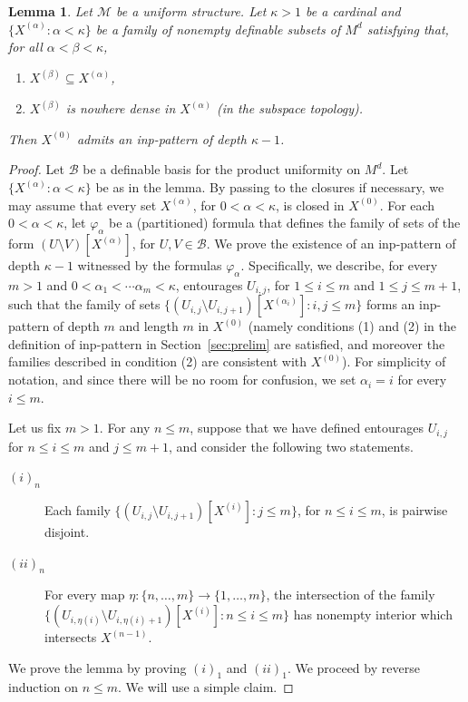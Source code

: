 \documentclass[12pt]{article}
\newcommand{\Bb}{\mathcal{B}}
\newcommand{\Mm}{\mathcal{M}}
\newcommand{\BU}{\Bb} %
\newcommand{\X}[1]{X^{(#1)}}
\newtheorem{lemma}[theorem]{Lemma}
\theoremstyle{definition}
\theoremstyle{remark}
\begin{document}
\begin{lemma}\label{lem:closed-chain}
Let $\Mm$ be a uniform structure. Let $\kappa>1$ be a cardinal and $\{ \X{\alpha} : \alpha < \kappa\}$ be a family of nonempty definable subsets of $M^d$ satisfying that, for all $\alpha < \beta < \kappa$,
\begin{enumerate}
    \item $\X{\beta} \subseteq \X{\alpha}$,
    \item $\X{\beta}$ is nowhere dense in $\X{\alpha}$ (in the subspace topology).
\end{enumerate}
Then $\X{0}$ admits an inp-pattern of depth $\kappa-1$. 
\end{lemma}
\begin{proof}
Let $\BU$ be a definable basis for the product uniformity on $M^d$. Let $\{ \X{\alpha} : \alpha < \kappa\}$ be as in the lemma. By passing to the closures if necessary, we may assume that every set $\X{\alpha}$, for $0<\alpha<\kappa$, is closed in $\X{0}$. For each $0<\alpha<\kappa$, let $\varphi_\alpha$ be a (partitioned) formula that defines the family of sets of the form $(U\setminus V)[\X{\alpha}]$, for $U,V\in \BU$. We prove the existence of an inp-pattern of depth $\kappa-1$ witnessed by the formulas $\varphi_\alpha$. Specifically, we describe, for every $m>1$ and $0<\alpha_1<\cdots\alpha_m < \kappa$, entourages $U_{i,j}$, for $1\leq i\leq m$ and $1\leq j\leq m+1$, such that the family of sets $\{ (U_{i,j} \setminus U_{i,j+1})[\X{\alpha_i}] : i, j\leq m\}$ forms an inp-pattern of depth $m$ and length $m$ in $\X{0}$ (namely conditions (1) and (2) in the definition of inp-pattern in Section~\ref{sec:prelim} are satisfied, and moreover the families described in condition (2) are consistent with $\X{0}$). For simplicity of notation, and since there will be no room for confusion, we set $\alpha_i=i$ for every $i\leq m$.

Let us fix $m>1$. For any $n\leq m$, suppose that we have defined entourages $U_{i,j}$ for $n\leq i \leq m$ and $j\leq m+1$, and consider the following two statements.
\begin{description}
    \item[$(i)_n$] Each family $\{ (U_{i,j} \setminus U_{i,j+1})[\X{i}] : j\leq m\}$, for $n\leq i\leq m$, is pairwise disjoint. 
    \item[$(ii)_n$] For every map $\eta:\{n,\ldots, m\}\rightarrow \{1,\ldots, m\}$, the intersection of the family $\{ (U_{i,\eta(i)} \setminus U_{i,\eta(i)+1})[\X{i}] : n\leq i\leq m \}$ has nonempty interior which intersects $\X{n-1}$.
\end{description}
We prove the lemma by proving $(i)_1$ and $(ii)_1$. We proceed by reverse induction on $n\leq m$. We will use a simple claim. 


\end{proof}
\end{document}
